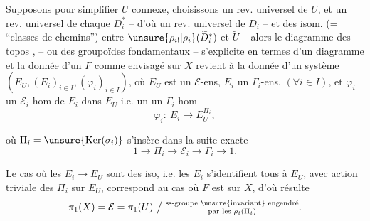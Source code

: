 Supposons pour simplifier $U$ connexe,
choisissons un rev. universel  de $U$, et un
rev. universel  de chaque $D_i^{*}$ -- d'où un
rev. universel  de $D_i$ -- et des isom.
(= ``classes de chemins'') entre $\unsure{\rho_{i!}|\rho_i}(\widetilde D_i^{*})$ et $\widetilde U$
-- alors le diagramme des topos \unsure{(*)},
-- ou des groupoïdes fondamentaux --
s'explicite en termes d'un diagramme
et la donnée d'un $F$ comme envisagé sur
$X$ revient à la donnée d'un système
$(E_U,(E_i)_{i\in I},(\varphi_i)_{i\in I})$, où $E_U$ est un $\mathcal E$-ens,
$E_i$ un $\Gamma_i$-ens, $(\forall i\in I)$, et $\varphi_i$ un
$\mathcal E_i$-hom de $E_i$ dans $E_U$ i.e. un
un $\Gamma_i$-hom
\[
\varphi_i:\ E_i\longrightarrow E_U^{\Pi_i},
\]

où  $\Pi_i=\unsure{\operatorname{Ker}(\sigma_i)}$ s'insère dans la suite exacte
\[
1\longrightarrow\Pi_i\longrightarrow\mathcal E_i\longrightarrow\Gamma_i\longrightarrow1.
\]

Le cas où les $E_i\longrightarrow E_U$ sont des iso,
i.e. les $E_i$ s'identifient  tous à $E_U$,
avec action triviale des $\Pi_i$ sur $E_U$, correspond
au cas où $F$ est  sur $X$,
d'où résulte
\[
\pi_1(X)=\mathcal E=\pi_1(U)\ \big/\ 
\substack{\text{ss-groupe \unsure{invariant} engendré}\\
\text{par les }\rho_i(\Pi_i)}.
\]

